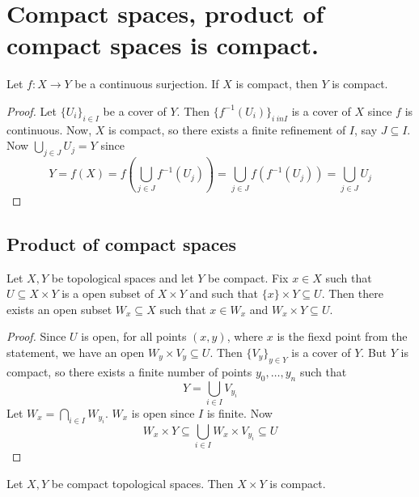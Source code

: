 \section{Compact spaces, product of compact spaces is compact.}

\begin{proposition}
    Let \( f: X \to Y \) be a continuous surjection.
    If \( X \) is compact, then \( Y \) is compact.
\end{proposition}

\begin{proof}
  Let \( \{ U_i \}_{i \in I}  \) be a cover of \( Y \).
  Then \( \{ {f}^{-1} (U_i) \}_{i \ in I} \) is a cover of
  \( X \) since \( f \) is continuous.
  Now, \( X \) is compact, so there exists a finite refinement
  of \( I \), say \( J \subseteq I \).
  Now \( \bigcup_{j \in J} U_j = Y \)  since
  \[
    Y = f(X) = f\left(\bigcup_{j \in J} {f}^{-1}(U_j)\right)
    = \bigcup_{j \in J} f\left({f}^{-1}(U_j)\right)
    = \bigcup_{j \in J} U_j
  \]
\end{proof}

\subsection{Product of compact spaces}

\begin{lemma}
   Let \( X, Y \) be topological spaces and let \( Y \) be compact.
   Fix \( x \in X \) such that \( U \subseteq X \times Y \) is a open subset of \( X \times Y \)
   and such that \( \{ x  \} \times Y \subseteq U  \).
   Then there exists an open subset \( W_x \subseteq X \) such that \( x \in W_x \) and \( W_x \times Y \subseteq U \).
\end{lemma}

\begin{proof}
  Since \( U \) is open, for all points \( (x, y) \),
  where \( x \) is the fiexd point from the statement,
  we have an open \( W_y \times V_y \subseteq U \).
  Then \( \{ V_y \} _{y \in Y} \) is a cover of 
  \( Y \). But \( Y \) is compact, so there exists
  a finite number of points \( y_0, \dots, y_n \) such that
  \[
  Y = \bigcup_{i \in I} V_{y_i}
  \]
  Let \( W_x = \bigcap_{i \in I} W_{y_i} \).
  \( W_x \) is open since \( I \) is finite.
  Now
  \[
    W_x \times Y \subseteq \bigcup_{i \in I} W_x \times V_{y_i} \subseteq U
  \]
\end{proof}

\begin{theorem}
  Let \( X, Y \) be compact topological spaces.
  Then \( X \times Y \) is compact.
\end{theorem}

